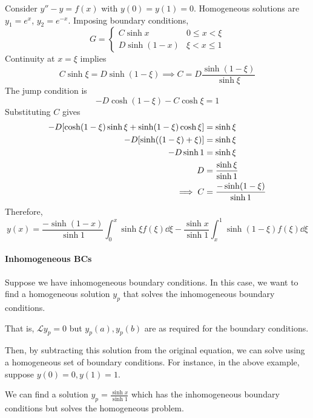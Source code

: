 \documentclass[a4paper]{article}
\begin{document}
\begin{example}
	Consider \( y'' - y = f(x) \) with \( y(0) = y(1) = 0 \).
	Homogeneous solutions are \( y_1 = e^x \), \( y_2 = e^{-x} \).
	Imposing boundary conditions,
	\[
		G = \begin{cases}
			C \sinh x    & 0 \leq x < \xi \\
			D \sinh(1-x) & \xi < x \leq 1
		\end{cases}
	\]
	Continuity at \( x = \xi \) implies
	\[
		C \sinh \xi = D \sinh (1 - \xi) \implies C = D \frac{\sinh (1-\xi)}{\sinh \xi}
	\]
	The jump condition is
	\[
		-D \cosh(1-\xi) - C \cosh \xi = 1
	\]
	Substituting $C$ gives
	\begin{align*}
		-D\qty[\cosh(1-\xi)\sinh \xi + \sinh(1-\xi)\cosh \xi] & = \sinh \xi                     \\
		-D\qty[\sinh((1-\xi) + \xi)]                          & = \sinh \xi                     \\
		-D\sinh 1                                             & = \sinh \xi                     \\
		D                                                     & = \frac{\sinh \xi}{\sinh 1}     \\
		\implies C                                          & = \frac{-\sinh(1-\xi)}{\sinh 1}
	\end{align*}
	Therefore,
	\[
		y(x) = \frac{-\sinh(1-x)}{\sinh 1} \int_0^x \sinh \xi f(\xi) \dd{\xi} - \frac{\sinh x}{\sinh 1} \int_x^1 \sinh (1-\xi) f(\xi) \dd{\xi}
	\]
\end{example}

\paragraph{Inhomogeneous BCs}
Suppose we have inhomogeneous boundary conditions.
In this case, we want to find a homogeneous solution \( y_p \) that solves the inhomogeneous boundary conditions.

That is, \( \mathcal L y_p = 0 \) but \( y_p(a), y_p(b) \) are as required for the boundary conditions.

Then, by subtracting this solution from the original equation, we can solve using a homogeneous set of boundary conditions.
For instance, in the above example, suppose \( y(0) = 0, y(1) = 1 \).

We can find a solution \( y_p = \frac{\sinh x}{\sinh 1} \) which has the inhomogeneous boundary conditions but solves the homogeneous problem.
\end{document}
